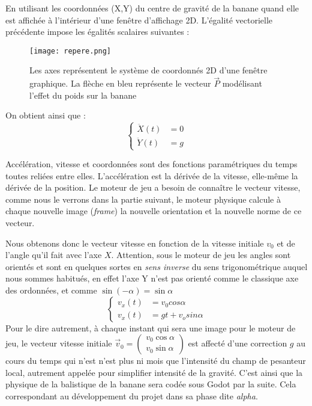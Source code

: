 \documentclass{tstextbook}
\begin{document}
En utilisant les coordonnées (X,Y) du centre de gravité de la banane quand elle est affichée à l'intérieur d'une fenêtre d'affichage 2D. L'égalité vectorielle précédente impose les égalités scalaires suivantes :
\begin{center}

\begin{figure}[h!]
\centering
\texttt{[image: repere.png]}
\caption{Les axes représentent le système de coordonnés 2D d'une fenêtre graphique. La flèche en bleu représente le vecteur $\vec{P}$ modélisant l'effet du poids sur la banane}
\end{figure}



On obtient ainsi que : 
$$
\left\{
    \begin{array}{ll}
   \ddot{X}(t) & = 0 \\
   \ddot{Y}(t) & = g
    \end{array}
\right.
$$
\end{center}
Accélération, vitesse et coordonnées sont des fonctions paramétriques du temps toutes reliées entre elles. L'accélération est la dérivée de la vitesse, elle-même la dérivée de la position.
Le moteur de jeu a besoin de connaître le vecteur vitesse, comme nous le verrons dans la partie suivant, le moteur physique calcule à chaque nouvelle image (\emph{frame}) la nouvelle orientation et la nouvelle norme de ce vecteur.

Nous obtenons donc le vecteur vitesse en fonction de la vitesse initiale $v_0$ et de l'angle qu'il fait avec l'axe $X$. Attention, sous le moteur de jeu les angles sont orientés et sont en quelques sortes en \textit{sens inverse} du sens trigonométrique auquel nous sommes habitués, en effet l'axe Y n'est pas orienté comme le classique axe des ordonnées, et comme $\sin (-\alpha)=\sin \alpha$
$$
\left\{
    \begin{array}{ll}
   {v_x(t)} & = v_0 cos \alpha \\
   {v_x(t)} & = gt+v_o sin \alpha
    \end{array}
\right.
$$
Pour le dire autrement, à chaque instant qui sera une image pour le moteur de jeu, le vecteur vitesse initiale $\vec{v}_0 = \begin{pmatrix}
v_0 \cos \alpha \\ v_0 \sin \alpha
\end{pmatrix}$
est affecté d'une correction $g$ au cours du temps qui n'est n'est plus ni mois que l'intensité du champ de pesanteur local, autrement appelée pour simplifier intensité de la gravité.
C'est ainsi que la physique de la balistique de la banane sera codée sous Godot par la suite. Cela correspondant au développement du projet dans sa phase dite \emph{alpha}.\\
\end{document}
